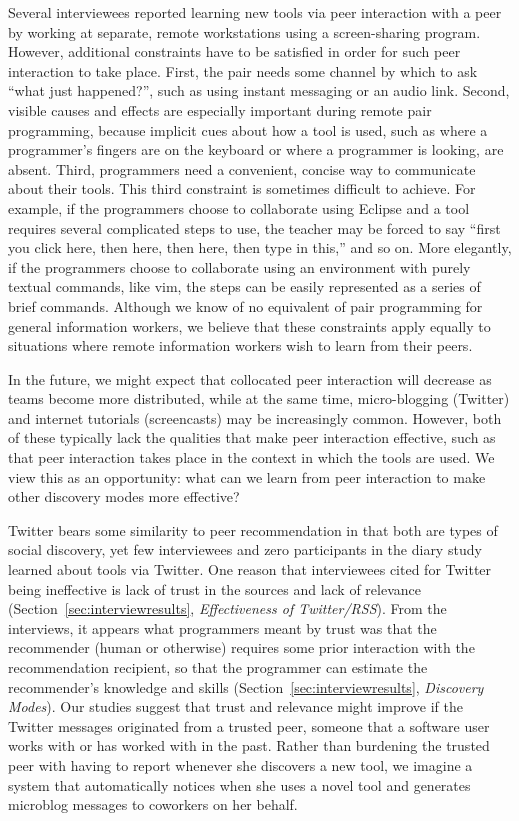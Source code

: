 \documentclass[smallextended]{svjour3}
\newcommand\discovery{peer interaction\xspace}
\newcommand\DisCovery{Peer Interaction\xspace}
\newcommand\discpush{peer recommendation\xspace}
\newcommand\contexts{modes\xspace}
\begin{document}
Several interviewees reported learning new tools via \discovery with
a peer by working at separate, remote workstations using
a screen-sharing program.
However, additional constraints have to be satisfied in order for such
\discovery to take place.
First, the pair needs some channel by which to ask ``what just happened?'', 
such as using instant messaging or an audio link.
Second, visible causes and effects are especially important during remote pair
programming, because implicit cues about how a tool is used, such as where a
programmer's fingers are on the keyboard or where a programmer is looking, are
absent. 
Third, programmers need a convenient, concise way to communicate about their
tools.
This third constraint is sometimes difficult to achieve.
For example, if the programmers choose to collaborate using Eclipse
and a tool requires several complicated steps to use, the teacher may be
forced to say ``first you click here, then here, then here, then type in
this,'' and so on. 
More elegantly, if the programmers choose to collaborate using an
environment with purely textual commands, like vim, the steps can be easily
represented as a series of brief commands.
Although we know of no equivalent of pair programming for general 
information workers, we believe that these constraints apply equally
to situations where remote information workers wish to learn from
their peers.

\paraHead{Learning from the Strengths of \DisCovery.}
In the future, we might expect that collocated \discovery will
decrease as teams become more distributed, while at the same time, 
micro-blogging (Twitter) and internet tutorials (screencasts) 
may be increasingly common.
However, both of these typically lack the qualities that make
\discovery effective, such as that \discovery takes place in the context 
in which the tools are used.
We view this as an opportunity: what can we learn from \discovery to make
other discovery \contexts more effective?

Twitter bears some similarity to \discpush in that
both are types of social discovery, yet few interviewees and 
zero participants in the diary study learned about tools via Twitter.
One reason that interviewees cited for Twitter being ineffective is lack of trust
in the sources and lack of relevance (Section~\ref{sec:interviewresults}, \textit{Effectiveness of Twitter/RSS}).
From the interviews, it appears what programmers meant by trust was that the
recommender (human or otherwise) requires some prior interaction with the
recommendation recipient, so that the programmer can estimate the recommender's knowledge and
skills (Section~\ref{sec:interviewresults}, \textit{Discovery Modes}).
Our studies suggest that trust and relevance might improve if the Twitter
messages originated from a trusted peer, someone that a software user works with
or has worked with in the past.
Rather than burdening the trusted peer with having to report whenever she
discovers a new tool, we imagine a system that automatically notices when she
uses a novel tool and generates microblog messages to coworkers on her behalf.
\end{document}
